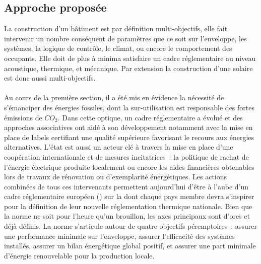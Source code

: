 \subsection{Approche proposée} %
\label{sub:approche_proposee}
La construction d’un bâtiment est par définition multi-objectifs, elle fait intervenir un
nombre conséquent de paramètres que ce soit sur l’enveloppe, les systèmes, la logique de
contrôle, le climat, ou encore le comportement des occupants. Elle doit de plus à minima
satisfaire un cadre réglementaire au niveau acoustique, thermique, et mécanique. Par extension
la construction d’une  solaire est donc aussi multi-objectifs.

\paragraph{} %
Au cours de la première section, il a été mis en évidence la nécessité de s’émanciper des
énergies fossiles, dont la sur-utilisation est responsable des fortes émissions de
$CO_{2}$. Dans cette optique, un cadre réglementaire a évolué et des approches
associatives ont aidé à son développement notamment avec la mise en place de labels
certifiant une qualité supérieure favorisant le recours aux énergies alternatives. L’état est
aussi un acteur clé à travers la mise en place d’une coopération internationale et de
mesures incitatrices~: la politique de rachat de l’énergie électrique produite localement
ou encore les aides financières obtenables lors de travaux de rénovation ou d’exemplarité
énergétiques. Les actions combinées de tous ces intervenants permettent
aujourd’hui d’être à l’aube d’un cadre réglementaire européen () sur la
 dont chaque pays membre devra s’inspirer pour la définition de leur nouvelle
réglementation thermique nationale. Bien que la norme ne soit pour l’heure qu’un
brouillon, les axes principaux sont d’ores et déjà définis. La norme s’articule autour de
quatre objectifs péremptoires~: assurer une performance minimale sur l’enveloppe, assurer
l’efficacité des systèmes installés, assurer un bilan énergétique global positif, et
assurer une part minimale d’énergie renouvelable pour la production locale.


